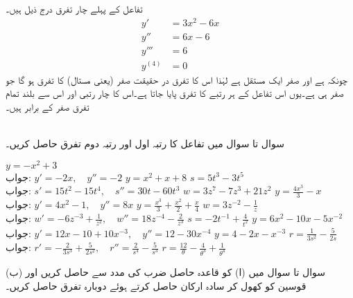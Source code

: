 تفاعل  کے پہلے چار تفرق درج ذیل ہیں۔
\begin{align*}
y'&=3x^2-6x\\
y''&=6x-6\\
y'''&=6\\
y^{(4)}&=0
\end{align*}
چونکہ  ہے اور صفر ایک مستقل ہے لہٰذا اس کا تفرق در حقیقت صفر (یعنی مستال) کا تفرق ہو گا جو صفر ہی ہے۔یوں اس تفاعل کے ہر رتبے کا تفرق پایا جاتا ہے۔اس کا چار رتبی اور اس سے بلند تمام تفرق صفر کے برابر ہیں۔

\\
سوال  تا سوال  میں تفاعل کا رتبہ اول اور رتبہ دوم تفرق حاصل کریں۔

$y=-x^2+3$\\
جواب:\quad
$y'=-2x,\quad y''=-2$
$y=x^2+x+8$
$s=5t^3-3t^5$\\
جواب:\quad
$s'=15t^2-15t^4,\quad s''=30t-60t^3$
$w=3z^7-7z^3+21z^2$
$y=\tfrac{4x^3}{3}-x$\\
جواب:\quad
$y'=4x^2-1,\quad y''=8x$
$y=\tfrac{x^3}{3}+\tfrac{x^2}{2}+\tfrac{x}{4}$
$w=3z^{-2}-\tfrac{1}{z}$\\
جواب:\quad
$w'=-6z^{-3}+\tfrac{1}{z^2},\quad w''=18z^{-4}-\tfrac{2}{z^3}$
$s=-2t^{-1}+\tfrac{4}{t^2}$
$y=6x^2-10x-5x^{-2}$\\
جواب:\quad
$y'=12x-10+10x^{-3},\quad y''=12-30x^{-4}$
$y=4-2x-x^{-3}$
$r=\tfrac{1}{3s^2}-\tfrac{5}{2s}$\\
جواب:\quad
$r'=-\tfrac{2}{3s^3}+\tfrac{5}{2s^2},\quad r''=\tfrac{2}{s^4}-\tfrac{5}{s^3}$
$r=\tfrac{12}{\theta}-\tfrac{4}{\theta^3}+\tfrac{1}{\theta^4}$

سوال  تا سوال  میں (ا)  کو قاعدہ حاصل ضرب کی مدد سے حاصل کریں اور (ب) قوسین کو کھول کر سادہ ارکان حاصل کرتے ہوئے دوبارہ تفرق حاصل کریں۔

